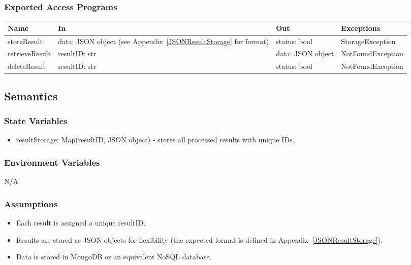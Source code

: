 \documentclass[12pt, titlepage]{article}
\begin{document}
\subsubsection{Exported Access Programs}

\begin{center}
\begin{tabular}{p{3cm} p{4cm} p{4cm} p{5cm}}
\hline
\textbf{Name} & \textbf{In} & \textbf{Out} & \textbf{Exceptions} \\
\hline
storeResult & \raggedright\arraybackslash data: JSON object (see Appendix~\ref{JSONResultStorage} for format) & \raggedright\arraybackslash status: bool & \raggedright\arraybackslash StorageException \\
\hline
retrieveResult & \raggedright\arraybackslash resultID: str & \raggedright\arraybackslash data: JSON object & \raggedright\arraybackslash NotFoundException \\
\hline
deleteResult & \raggedright\arraybackslash resultID: str & \raggedright\arraybackslash status: bool & \raggedright\arraybackslash NotFoundException \\
\hline
\end{tabular}
\end{center}

\subsection{Semantics}

\subsubsection{State Variables}

\begin{itemize}
\item resultStorage: Map(resultID, JSON object) - stores all processed results with unique IDs.
\end{itemize}

\subsubsection{Environment Variables}

N/A

\subsubsection{Assumptions}

\begin{itemize}
\item Each result is assigned a unique resultID.
\item Results are stored as JSON objects for flexibility (the expected format is defined in Appendix~\ref{JSONResultStorage}).
\item Data is stored in MongoDB or an equivalent NoSQL database.
\end{itemize}
\end{document}
